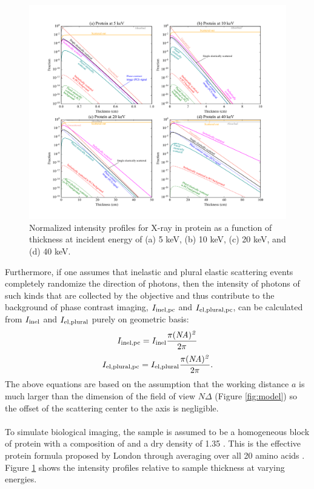 \documentclass[]{article}
\newcommand\inel{\textup{\scriptsize{inel}}}
\newcommand\elpl{\textup{\scriptsize{el,plural}}}
\newcommand\inelpc{\textup{\scriptsize{inel,pc}}}
\newcommand\elplpc{\textup{\scriptsize{el,plural,pc}}}
\begin{document}
\begin{figure}[!t]
\begin{center}
\includegraphics[scale=.6]{unimatrix_fig.pdf}
\caption{Normalized intensity profiles for X-ray in protein as a function of thickness at incident energy of (a) 5 keV, (b) 10 keV, (c) 20 keV, and (d) 40 keV.}
\label{fig:protein_x_cate}
\end{center}
\end{figure}

Furthermore, if one assumes that inelastic and plural elastic scattering events completely randomize the direction of photons, then the intensity of photons of such kinds that are collected by the objective and thus contribute to the background of phase contrast imaging, $I_{\inelpc}$ and $I_{\elplpc}$, can be calculated from $I_{\inel}$ and $I_{\elpl}$ purely on geometric basis:
\begin{equation}
I_{\inelpc} = I_{\inel}\frac{\pi (\it{NA})^2}{2\pi}
\end{equation}
\begin{equation}
I_{\elplpc} = I_{\elpl}\frac{\pi (\it{NA})^2}{2\pi}.
\end{equation}
The above equations are based on the assumption that the working distance $a$ is much larger than the dimension of the field of view $N\Delta$ (Figure \ref{fig:model}) so the offset of the scattering center to the axis is negligible. 

\paragraph{} To simulate biological imaging, the sample is assumed to be a homogeneous block of protein with a composition of  and a dry density of 1.35 . This is the effective protein formula proposed by London through averaging over all 20 amino acids \cite{London:1989hh}. Figure \ref{fig:protein_x_cate} shows the intensity profiles relative to sample thickness at varying energies. 
\end{document}
